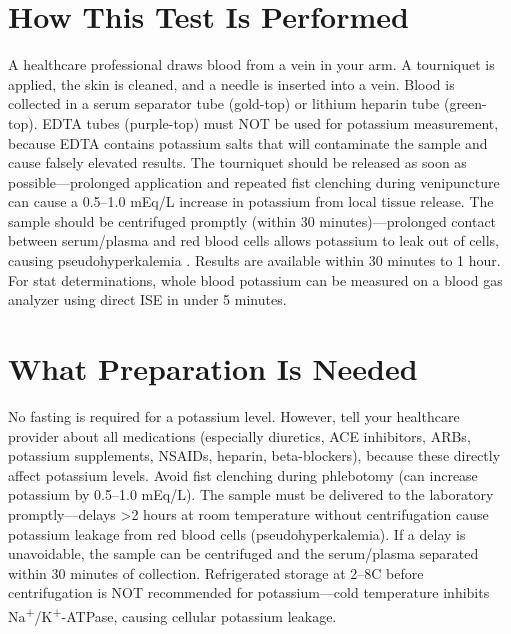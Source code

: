 \section*{How This Test Is Performed}
A healthcare professional draws blood from a vein in your arm. A tourniquet is applied, the skin is cleaned, and a needle is inserted into a vein. Blood is collected in a serum separator tube (gold-top) or lithium heparin tube (green-top). EDTA tubes (purple-top) must NOT be used for potassium measurement, because EDTA contains potassium salts that will contaminate the sample and cause falsely elevated results. The tourniquet should be released as soon as possible---prolonged application and repeated fist clenching during venipuncture can cause a 0.5--1.0 mEq/L increase in potassium from local tissue release. The sample should be centrifuged promptly (within 30 minutes)---prolonged contact between serum/plasma and red blood cells allows potassium to leak out of cells, causing pseudohyperkalemia \cite{fischbach2023manual}. Results are available within 30 minutes to 1 hour. For stat determinations, whole blood potassium can be measured on a blood gas analyzer using direct ISE in under 5 minutes.

\section*{What Preparation Is Needed}
No fasting is required for a potassium level. However, tell your healthcare provider about all medications (especially diuretics, ACE inhibitors, ARBs, potassium supplements, NSAIDs, heparin, beta-blockers), because these directly affect potassium levels. Avoid fist clenching during phlebotomy (can increase potassium by 0.5--1.0 mEq/L). The sample must be delivered to the laboratory promptly---delays >2 hours at room temperature without centrifugation cause potassium leakage from red blood cells (pseudohyperkalemia). If a delay is unavoidable, the sample can be centrifuged and the serum/plasma separated within 30 minutes of collection. Refrigerated storage at 2--8\textdegree C before centrifugation is NOT recommended for potassium---cold temperature inhibits Na\textsuperscript{+}/K\textsuperscript{+}-ATPase, causing cellular potassium leakage.

